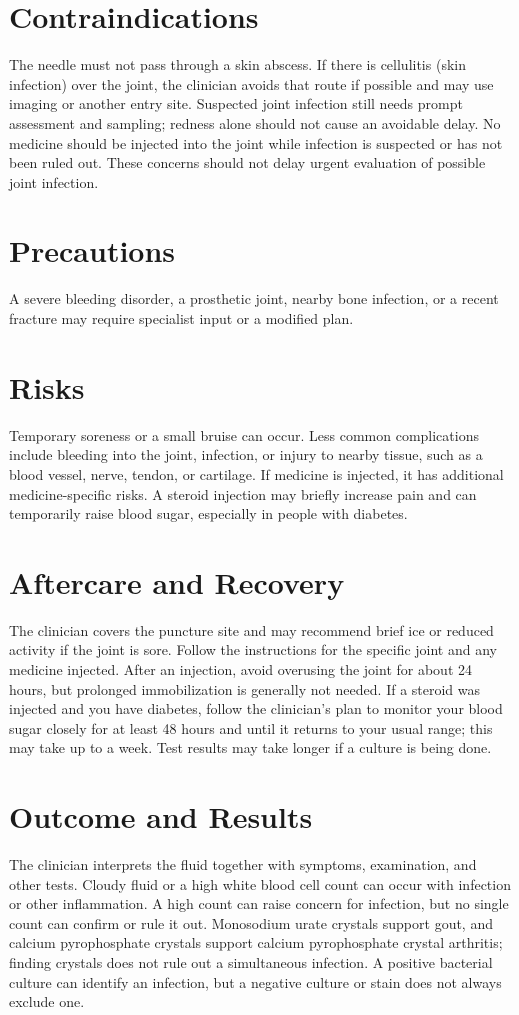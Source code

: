 \section*{Contraindications}
The needle must not pass through a skin abscess. If there is cellulitis (skin infection) over the joint, the clinician avoids that route if possible and may use imaging or another entry site. Suspected joint infection still needs prompt assessment and sampling; redness alone should not cause an avoidable delay. No medicine should be injected into the joint while infection is suspected or has not been ruled out. These concerns should not delay urgent evaluation of possible joint infection.

\section*{Precautions}
A severe bleeding disorder, a prosthetic joint, nearby bone infection, or a recent fracture may require specialist input or a modified plan.

\section*{Risks}
Temporary soreness or a small bruise can occur. Less common complications include bleeding into the joint, infection, or injury to nearby tissue, such as a blood vessel, nerve, tendon, or cartilage. If medicine is injected, it has additional medicine-specific risks. A steroid injection may briefly increase pain and can temporarily raise blood sugar, especially in people with diabetes.

\section*{Aftercare and Recovery}
The clinician covers the puncture site and may recommend brief ice or reduced activity if the joint is sore. Follow the instructions for the specific joint and any medicine injected. After an injection, avoid overusing the joint for about 24 hours, but prolonged immobilization is generally not needed. If a steroid was injected and you have diabetes, follow the clinician's plan to monitor your blood sugar closely for at least 48 hours and until it returns to your usual range; this may take up to a week. Test results may take longer if a culture is being done.

\section*{Outcome and Results}
The clinician interprets the fluid together with symptoms, examination, and other tests. Cloudy fluid or a high white blood cell count can occur with infection or other inflammation. A high count can raise concern for infection, but no single count can confirm or rule it out. Monosodium urate crystals support gout, and calcium pyrophosphate crystals support calcium pyrophosphate crystal arthritis; finding crystals does not rule out a simultaneous infection. A positive bacterial culture can identify an infection, but a negative culture or stain does not always exclude one.

